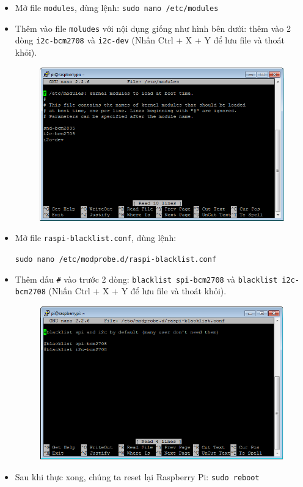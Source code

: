\begin{itemize}
\item Mở file \verb|modules|, dùng lệnh: \verb|sudo nano /etc/modules|
\item Thêm vào file \verb|moludes| với nội dụng giống như hình bên dưới: thêm vào 2 dòng \verb|i2c-bcm2708| và \verb|i2c-dev| (Nhấn Ctrl + X + Y để lưu file và thoát khỏi).
\begin{figure}[!h]
\begin{center}
\includegraphics[scale=.5]{GPIO/images/raspi-9}
\end{center}
\end{figure}
\item Mở file \verb|raspi-blacklist.conf|, dùng lệnh:
\begin{center}
\verb|sudo nano /etc/modprobe.d/raspi-blacklist.conf|
\end{center}
\item Thêm dấu \verb|#| vào trước 2 dòng: \verb|blacklist spi-bcm2708| và \verb|blacklist i2c-bcm2708| (Nhấn Ctrl + X + Y để lưu file và thoát khỏi).
\begin{figure}[!h]
\begin{center}
\includegraphics[scale=.5]{GPIO/images/raspi-10}
\end{center}
\end{figure}
\item Sau khi thực xong, chúng ta reset lại Raspberry Pi: \verb|sudo reboot|
\end{itemize} 
